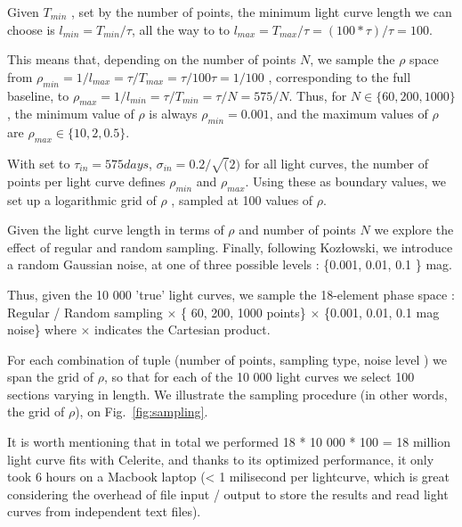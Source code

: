 \documentclass[fleqn,usenatbib]{mnras}  %
\begin{document}
Given  $T_{min}$ , set by the number of points, the minimum light curve length we can choose is  $l_{min} = T_{min} / \tau$, all the way to to $  l_{max} = T_{max} / \tau = (100 * \tau )/ \tau = 100$.  

This means that, depending on the number of points $N$, we sample the  $\rho$ space from $\rho_{min} = 1 / l_{max} = \tau / T_{max} = \tau / 100 \tau = 1 / 100 $ , corresponding to the full baseline,  to  $\rho_{max} = 1 / l_{min} = \tau / T_{min} = \tau / N = 575 / N $. Thus, for  $N \in \{60,200,1000\}$,  the minimum value of $\rho$ is always $\rho_{min} = 0.001$, and the maximum values of $\rho$ are $\rho_{max} \in \{10,2,0.5\}$. 

With set to  $\tau_{in} = 575 days$, $\sigma_{in} = 0.2 / \sqrt(2)$  for all light curves,  the number of points per light curve defines $\rho_{min}$ and $\rho_{max}$. Using these as boundary values, we set up a logarithmic grid of $\rho$ , sampled at 100 values of $\rho$.  

Given the light curve length in terms of $\rho$ and number of points $N$ we explore the effect of  regular and  random sampling. Finally, following Koz{\l}owski, we introduce a random Gaussian noise, at one of three possible levels :  \{0.001, 0.01, 0.1 \} mag.  

Thus, given the 10 000 'true' light curves, we sample the 18-element phase space  : { Regular / Random sampling  } $\times$   \{ 60, 200, 1000 points\} $\times$ \{0.001, 0.01, 0.1 mag noise\} where $\times$   indicates the Cartesian product. 

For each combination of tuple (number of points, sampling type, noise level ) we span the grid of $\rho$, so that for each of the 10 000 light curves we select 100  sections varying in length. We illustrate the sampling procedure (in other words, the grid of $\rho$), on Fig.~\ref{fig:sampling}. 

It is worth mentioning that in total we performed 18 * 10 000 * 100  = 18 million  light curve fits with Celerite, and thanks to its optimized performance, it only took 6 hours on a Macbook laptop  (< 1 milisecond per lightcurve, which is great considering the overhead of file input / output to store the results and read light curves from independent text files).  
    
\end{document}
